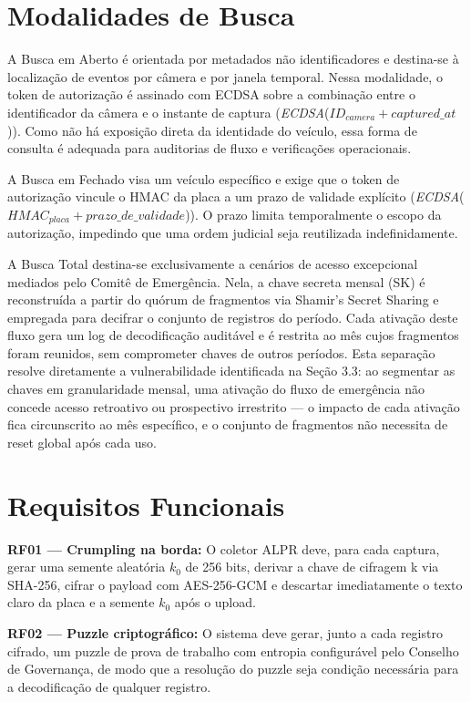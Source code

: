 \section{Modalidades de Busca}
A Busca em Aberto é orientada por metadados não identificadores e destina-se à localização de eventos por câmera e por janela temporal. Nessa modalidade, o token de autorização é assinado com ECDSA sobre a combinação entre o identificador da câmera e o instante de captura (\textit{ECDSA}($ID_{camera} + captured\_at$)). Como não há exposição direta da identidade do veículo, essa forma de consulta é adequada para auditorias de fluxo e verificações operacionais.

A Busca em Fechado visa um veículo específico e exige que o token de autorização vincule o HMAC da placa a um prazo de validade explícito (\textit {ECDSA}($HMAC_{placa} + prazo\_de\_validade$)). O prazo limita temporalmente o escopo da autorização, impedindo que uma ordem judicial seja reutilizada indefinidamente.

A Busca Total destina-se exclusivamente a cenários de acesso excepcional mediados pelo Comitê de Emergência. Nela, a chave secreta mensal (SK) é reconstruída a partir do quórum de fragmentos via Shamir's Secret Sharing e empregada para decifrar o conjunto de registros do período. Cada ativação deste fluxo gera um log de decodificação auditável e é restrita ao mês cujos fragmentos foram reunidos, sem comprometer chaves de outros períodos. Esta separação resolve diretamente a vulnerabilidade identificada na Seção 3.3: ao segmentar as chaves em granularidade mensal, uma ativação do fluxo de emergência não concede acesso retroativo ou prospectivo irrestrito — o impacto de cada ativação fica circunscrito ao mês específico, e o conjunto de fragmentos não necessita de reset global após cada uso.

\section{Requisitos Funcionais}
\noindent\textbf{RF01 — Crumpling na borda:} O coletor ALPR deve, para cada captura, gerar uma semente aleatória $k_0$ de 256 bits, derivar a chave de cifragem k via SHA-256, cifrar o payload com AES-256-GCM e descartar imediatamente o texto claro da placa e a semente $k_0$ após o upload.

\noindent\textbf{RF02 — Puzzle criptográfico:} O sistema deve gerar, junto a cada registro cifrado, um puzzle de prova de trabalho com entropia configurável pelo Conselho de Governança, de modo que a resolução do puzzle seja condição necessária para a decodificação de qualquer registro.

